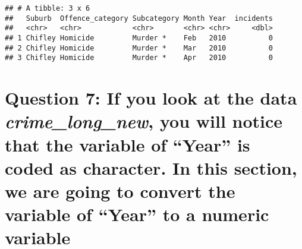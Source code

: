 \documentclass[
]{article}
\newenvironment{Shaded}{\begin{snugshade}}{\end{snugshade}}
\newcommand{\CommentTok}[1]{\textcolor[rgb]{0.56,0.35,0.01}{\textit{#1}}}
\newcommand{\DataTypeTok}[1]{\textcolor[rgb]{0.13,0.29,0.53}{#1}}
\newcommand{\DecValTok}[1]{\textcolor[rgb]{0.00,0.00,0.81}{#1}}
\newcommand{\KeywordTok}[1]{\textcolor[rgb]{0.13,0.29,0.53}{\textbf{#1}}}
\newcommand{\NormalTok}[1]{#1}
\newcommand{\OperatorTok}[1]{\textcolor[rgb]{0.81,0.36,0.00}{\textbf{#1}}}
\newcommand{\StringTok}[1]{\textcolor[rgb]{0.31,0.60,0.02}{#1}}
\begin{document}
\begin{Shaded}
\end{Shaded}

\begin{verbatim}
## # A tibble: 3 x 6
##   Suburb  Offence_category Subcategory Month Year  incidents
##   <chr>   <chr>            <chr>       <chr> <chr>     <dbl>
## 1 Chifley Homicide         Murder *    Feb   2010          0
## 2 Chifley Homicide         Murder *    Mar   2010          0
## 3 Chifley Homicide         Murder *    Apr   2010          0
\end{verbatim}

\hypertarget{question-7-if-you-look-at-the-data-crime_long_new-you-will-notice-that-the-variable-of-year-is-coded-as-character.-in-this-section-we-are-going-to-convert-the-variable-of-year-to-a-numeric-variable}{%
\section{\texorpdfstring{Question 7: If you look at the data
\emph{crime\_long\_new}, you will notice that the variable of ``Year''
is coded as character. In this section, we are going to convert the
variable of ``Year'' to a numeric
variable}{Question 7: If you look at the data crime\_long\_new, you will notice that the variable of ``Year'' is coded as character. In this section, we are going to convert the variable of ``Year'' to a numeric variable}}\label{question-7-if-you-look-at-the-data-crime_long_new-you-will-notice-that-the-variable-of-year-is-coded-as-character.-in-this-section-we-are-going-to-convert-the-variable-of-year-to-a-numeric-variable}}

\begin{Shaded}
\end{Shaded}
\end{document}
